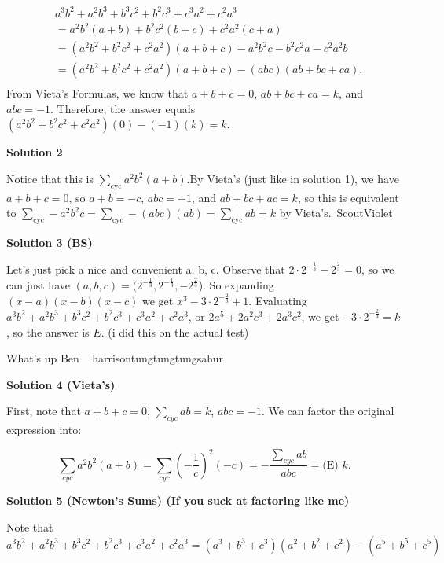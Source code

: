 \begin{enumerate}
 \begin{equation}\begin{split}&a^3b^2+a^2b^3+b^3c^2+b^2c^3+c^3a^2+c^2a^3 \\&=a^2b^2(a+b)+b^2c^2(b+c)+c^2a^2(c+a)\\&=(a^2b^2+b^2c^2+c^2a^2)(a+b+c) - a^2b^2c-b^2c^2a-c^2a^2b\\&=(a^2b^2+b^2c^2+c^2a^2)(a+b+c) - (abc)(ab+bc+ca).\\\end{split}\end{equation}From Vieta's Formulas, we know that $a+b+c = 0$, $ab+bc+ca = k$, and $abc = -1$. Therefore, the answer equals $(a^2b^2+b^2c^2+c^2a^2)(0) - (-1)(k) = \boxed{k}.$




\textbf{Solution 2}

Notice that this is $\sum_{\text{cyc}} a^2b^2(a+b)$.By Vieta's (just like in solution 1), we have $a+b+c=0$, so $a+b=-c$, $abc=-1$, and $ab+bc+ac=k$, so this is equivalent to $\sum_{\text{cyc}} -a^2b^2c = \sum_{\text{cyc}} -(abc)(ab) = \sum_{\text{cyc}} ab = k$ by Vieta's.~ScoutViolet

 



\textbf{Solution 3 (BS)}

Let’s just pick a nice and convenient a, b, c. Observe that $2\cdot2^{-\frac13}-2^\frac23=0$, so we can just have $(a,b,c)=(2^{-\frac13}, 2^{-\frac13},-2^\frac23$). So expanding $(x-a)(x-b)(x-c)$ we get $x^3-3\cdot2^{-\frac23}+1$. Evaluating $a^3b^2 + a^2b^3 + b^3c^2 + b^2c^3 + c^3a^2 + c^2a^3$, or $2a^5+2a^2c^3+2a^3c^2$, we get $-3\cdot2^{-\frac23}=k$, so the answer is $\boxed{\textit{E}}$. (i did this on the actual test)

 What’s up Ben ~ harrisontungtungtungsahur

 



\textbf{Solution 4 (Vieta's)}

First, note that $a+b+c=0$, $\sum_{cyc} ab = k$, $abc=-1$. We can factor the original expression into:

 
 \[\sum_{cyc} a^2b^2(a+b) = \sum_{cyc} \left(-\frac{1}{c}\right)^2(-c) = -\frac{\sum_{cyc} ab}{abc} = \boxed{\text{(E) } k.}\]




\textbf{Solution 5 (Newton's Sums) (If you suck at factoring like me)}

Note that $a^3b^2+a^2b^3+b^3c^2+b^2c^3+c^3a^2+c^2a^3 = (a^3+b^3+c^3)(a^2+b^2+c^2)-(a^5+b^5+c^5)$


\end{enumerate}
